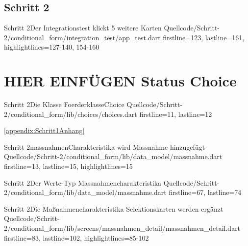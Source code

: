 \subsection{Schritt 2}

\begin{alexlisting}{Schritt 2}{Der Integrationstest klickt 5 weitere Karten}
  {Quellcode/Schritt-2/conditional_form/integration_test/app_test.dart}
  {firstline=123, lastline=161, highlightlines={127-140, 154-160}}
  \label{lst:IntegrationstestKlickt5WeitereKarten}
\end{alexlisting}

\section{HIER EINFÜGEN Status Choice}

\begin{alexlisting}{Schritt 2}{Die Klasse FoerderklasseChoice}
  {Quellcode/Schritt-2/conditional_form/lib/choices/choices.dart}
  {firstline=11, lastline=12}
  \label{lst:Schritt2KlasseFoerderklasseChoice}
\end{alexlisting}

 \ref{appendix:Schritt1Anhang} 



\begin{alexlisting}{Schritt 2}{massnahmenCharakteristika wird Massnahme hinzugefügt}
  {Quellcode/Schritt-2/conditional_form/lib/data_model/massnahme.dart}
  {firstline=13, lastline=15, highlightlines={15}}
  \label{lst:Schritt2massnahmenCharakteristika wird Massnahme hinzugefügt}
\end{alexlisting}


\begin{alexlisting}{Schritt 2}{Der Werte-Typ Massnahmencharakteristika}
  {Quellcode/Schritt-2/conditional_form/lib/data_model/massnahme.dart}
  {firstline=67, lastline=74}
  \label{lst:Schritt2WerteTypMassnahmencharakteristika}
\end{alexlisting}

\begin{alexlisting}{Schritt 2}{Die Maßnahmencharakteristika Selektionskarten werden ergänzt}
  {Quellcode/Schritt-2/conditional_form/lib/screens/massnahmen_detail/massnahmen_detail.dart}
  {firstline=83, lastline=102, highlightlines={85-102}}
  \label{lst:Schritt2MaßnahmencharakteristikaSelektionskartenWerdenErgaenzt}
\end{alexlisting}





